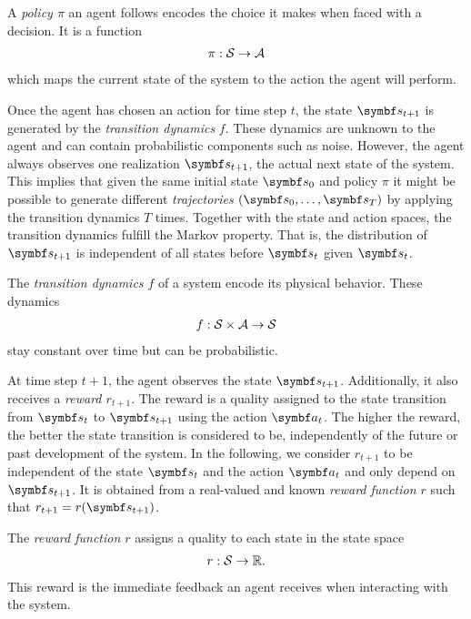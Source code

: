 \begin{definition}[Policy]
    A \emph{policy $\pi$} an agent follows encodes the choice it makes when faced with a decision.
    It is a function
    \begin{align}
        \pi: \mathcal{S} \to \mathcal{A}
    \end{align}
    which maps the current state of the system to the action the agent will perform.
\end{definition}

Once the agent has chosen an action for time step $t$, the state $\mat{s}_{t+1}$ is generated by the \emph{transition dynamics} $f$.
These dynamics are unknown to the agent and can contain probabilistic components such as noise.
However, the agent always observes one realization $\mat{s}_{t+1}$, the actual next state of the system.
This implies that given the same initial state $\mat{s}_0$ and policy $\pi$ it might be possible to generate different \emph{trajectories} $(\mat{s}_0, \dots, \mat{s}_T)$ by applying the transition dynamics $T$ times.
Together with the state and action spaces, the transition dynamics fulfill the Markov property.
That is, the distribution of $\mat{s}_{t+1}$ is independent of all states before $\mat{s}_t$ given $\mat{s}_t$.
\begin{definition}
    \label{def:bayesian_rl:transition_dynamics}
    The \emph{transition dynamics $f$} of a system encode its physical behavior.
    These dynamics
    \begin{align}
        f: \mathcal{S} \times \mathcal{A} \to \mathcal{S}
    \end{align}
    stay constant over time but can be probabilistic.
\end{definition}

At time step $t+1$, the agent observes the state $\mat{s}_{t+1}$.
Additionally, it also receives a \emph{reward $r_{t+1}$}.
The reward is a quality assigned to the state transition from $\mat{s}_t$ to $\mat{s}_{t+1}$ using the action $\mat{a}_t$.
The higher the reward, the better the state transition is considered to be, independently of the future or past development of the system.
In the following, we consider $r_{t+1}$ to be independent of the state $\mat{s}_t$ and the action $\mat{a}_t$ and only depend on $\mat{s}_{t+1}$.
It is obtained from a real-valued and known \emph{reward function $r$} such that $r_{t+1} = r(\mat{s}_{t+1})$.
\begin{definition}
    \label{def:bayesian_rl:reward_function}
    The \emph{reward function $r$} assigns a quality to each state in the state space
    \begin{align}
        r : \mathcal{S} \to \mathbb{R}.
    \end{align}
    This reward is the immediate feedback an agent receives when interacting with the system.
\end{definition}

